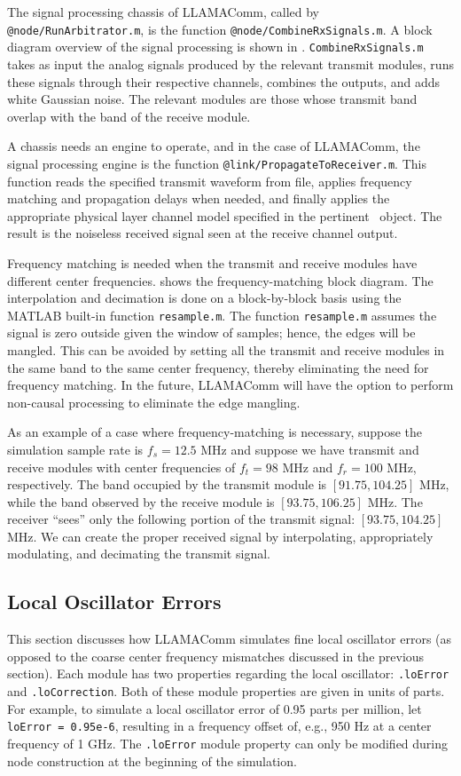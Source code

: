 %
The signal processing chassis of LLAMAComm, called by
\verb+@node/RunArbitrator.m+, is the function
\verb+@node/CombineRxSignals.m+.  A block diagram overview of the
signal processing is shown in .
\verb+CombineRxSignals.m+ takes as input the analog signals produced
by the relevant transmit modules, runs these signals through their
respective channels, combines the outputs, and adds white Gaussian
noise. The relevant modules are those whose transmit band overlap
with the band of the receive module.

A chassis needs an engine to operate, and in the case of LLAMAComm,
the signal processing engine is the function
\verb+@link/PropagateToReceiver.m+.  This function reads the
specified transmit waveform from file, applies frequency matching and propagation delays when needed, and finally applies the appropriate physical layer channel
model specified in the pertinent \link\ object.  The result is the
noiseless received signal seen at the receive \module channel
output.

Frequency matching is needed when the transmit and receive modules have
different center frequencies.  shows the frequency-matching
block diagram. The interpolation and decimation is done on a block-by-block
basis using the MATLAB built-in function \verb+resample.m+.  The function
\verb+resample.m+ assumes the signal is zero outside given the window of
samples; hence, the edges will be mangled.  This can be avoided by setting all
the transmit and receive modules in the same band to the same center frequency,
thereby eliminating the need for frequency matching.  In the future, LLAMAComm
will have the option to perform non-causal processing to eliminate the edge
mangling.

As an example of a case where frequency-matching is necessary, suppose the
simulation sample rate is $f_s = 12.5$ MHz and suppose we have transmit and
receive modules with center frequencies of $f_t = 98$ MHz and $f_r = 100$ MHz,
respectively. The band occupied by the transmit module is $[91.75, 104.25]$
MHz, while the band observed by the receive module is $[93.75, 106.25]$ MHz.
The receiver ``sees'' only the following portion of the transmit signal:
$[93.75, 104.25]$ MHz. We can create the proper received signal by
interpolating, appropriately modulating, and decimating the transmit signal.

\subsection{Local Oscillator Errors} \label{sec:localoscillatorerrors}
This section discusses how LLAMAComm simulates fine local oscillator errors (as opposed to the coarse center frequency mismatches discussed in the previous section).  Each module has two properties regarding the local oscillator: \verb+.loError+ and \verb+.loCorrection+.  Both of these module properties are given in units of parts.  For example, to simulate a local oscillator error of 0.95 parts per million, let \verb+loError = 0.95e-6+, resulting in a frequency offset of, e.g., 950 Hz at a center frequency of 1 GHz.  The \verb+.loError+ module property can only be modified during node construction at the beginning of the simulation.

